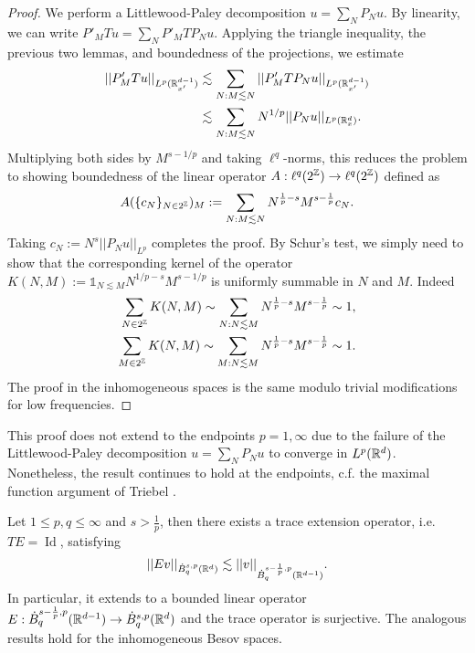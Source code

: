 \begin{proof}
	We perform a Littlewood-Paley decomposition $u = \sum_N P_N u$. By linearity, we can write $P'_M T u = \sum_N P'_M T P_N u$. Applying the triangle inequality, the previous two lemmas, and boundedness of the projections, we estimate
		\begin{align*}
			||P'_M Tu||_{L^p (\mathbb R^{d-1}_{x'})}
				&\lesssim \sum_{N : M \lesssim N} ||P'_M T P_N u||_{L^p (\mathbb R^{d - 1}_{x'})}\\
				&\lesssim \sum_{N : M \lesssim N} N^{1/p} ||P_N u||_{L^p (\mathbb R^d_x)}.
		\end{align*}		
	Multiplying both sides by $M^{s- 1/p}$ and taking $\ell^q$-norms, this reduces the problem to showing boundedness of the linear operator $A : \ell^q (2^\mathbb Z) \to \ell^q (2^\mathbb Z)$ defined as
		\[ A (\{ c_N\}_{N \in 2^\mathbb Z})_M := \sum_{N : M \lesssim N} N^{\frac1p - s} M^{s - \frac1p} c_N. \]
	Taking $c_N := N^s ||P_N u||_{L^p}$ completes the proof. By Schur's test, we simply need to show that the corresponding kernel of the operator $K(N, M) := \mathbb 1_{N \lesssim M} N^{1/p - s} M^{s - 1/p}$ is uniformly summable in $N$ and $M$. Indeed
	\begin{align*}
		\sum_{N \in 2^\mathbb Z}K (N, M) \sim  \sum_{N : N \lesssim M} N^{\frac1p - s} M^{s - \frac1p} \sim 1, \\
		\sum_{M \in 2^\mathbb Z}K (N, M) \sim  \sum_{M : N \lesssim M} N^{\frac1p - s} M^{s - \frac1p} \sim 1.
	\end{align*}
	The proof in the inhomogeneous spaces is the same modulo trivial modifications for low frequencies. 
\end{proof}

\begin{remark}
	This proof does not extend to the endpoints $p = 1, \infty$ due to the failure of the Littlewood-Paley decomposition $u = \sum_N P_N u$ to converge in $L^p (\mathbb R^d)$. Nonetheless, the result continues to hold at the endpoints, c.f. the maximal function argument of Triebel \cite[Theorem 2.7.2]{Triebel1983}. 
\end{remark}

\begin{theorem}
\label{thm:besovext}
	Let $1 \leq p, q \leq \infty$ and $s > \frac1p$, then there exists a trace extension operator, i.e. $TE = \operatorname{Id}$, satisfying 
		\[ ||Ev||_{\dot B^{s, p}_q (\mathbb R^{d})} \lesssim ||v||_{\dot B^{s - \frac1p, p}_q (\mathbb R^{d - 1})}. \]
	In particular, it extends to a bounded linear operator $E : \dot B^{s - \frac1p, p}_q (\mathbb R^{d - 1}) \to \dot B^{s, p}_q (\mathbb R^d)$ and the trace operator is surjective. The analogous results hold for the inhomogeneous Besov spaces. 
\end{theorem}

